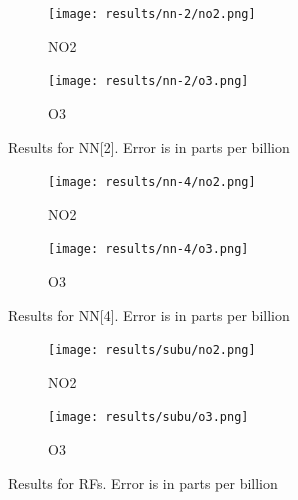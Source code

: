 \documentclass[journal abbreviation, manuscript]{copernicus}
\begin{document}
\begin{figure}[H]
\centering
\begin{subfigure}{0.45\textwidth}
\texttt{[image: results/nn-2/no2.png]}
\caption{NO2}
\end{subfigure}
\begin{subfigure}{0.45\textwidth}
\texttt{[image: results/nn-2/o3.png]}
\caption{O3}
\end{subfigure}
\caption{Results for NN[2]. Error is in parts per billion}
\label{fig:results-nn2}
\end{figure}

\begin{figure}[H]
\centering
\begin{subfigure}{0.45\textwidth}
\texttt{[image: results/nn-4/no2.png]}
\caption{NO2}
\end{subfigure}
\begin{subfigure}{0.45\textwidth}
\texttt{[image: results/nn-4/o3.png]}
\caption{O3}
\end{subfigure}
\caption{Results for NN[4]. Error is in parts per billion}
\label{fig:results-nn4}
\end{figure}

\begin{figure}[h]
\centering
\begin{subfigure}{0.45\textwidth}
\texttt{[image: results/subu/no2.png]}
\caption{NO2}
\end{subfigure}
\begin{subfigure}{0.45\textwidth}
\texttt{[image: results/subu/o3.png]}
\caption{O3}
\end{subfigure}
\caption{Results for RFs. Error is in parts per billion}
\label{fig:results-subu}
\end{figure}
\end{document}
